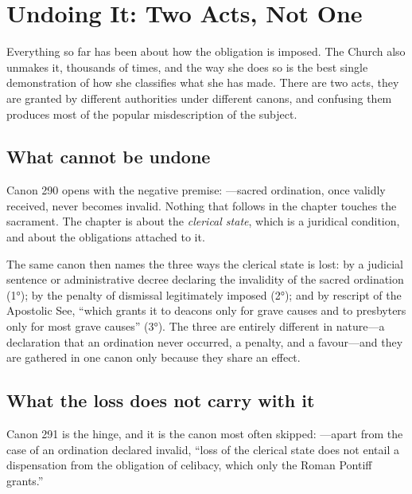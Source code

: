 \section{Undoing It: Two Acts, Not One}

Everything so far has been about how the obligation is imposed. The Church also unmakes it, thousands of times, and the way she does so is the best single demonstration of how she classifies what she has made. There are two acts, they are granted by different authorities under different canons, and confusing them produces most of the popular misdescription of the subject.

\subsection{What cannot be undone}

Canon 290 opens with the negative premise: ---sacred ordination, once validly received, never becomes invalid. Nothing that follows in the chapter touches the sacrament. The chapter is about the \emph{clerical state}, which is a juridical condition, and about the obligations attached to it.

The same canon then names the three ways the clerical state is lost: by a judicial sentence or administrative decree declaring the invalidity of the sacred ordination (1°); by the penalty of dismissal legitimately imposed (2°); and by rescript of the Apostolic See, ``which grants it to deacons only for grave causes and to presbyters only for most grave causes'' (3°). The three are entirely different in nature---a declaration that an ordination never occurred, a penalty, and a favour---and they are gathered in one canon only because they share an effect.

\subsection{What the loss does not carry with it}

Canon 291 is the hinge, and it is the canon most often skipped: ---apart from the case of an ordination declared invalid, ``loss of the clerical state does not entail a dispensation from the obligation of celibacy, which only the Roman Pontiff grants.''

